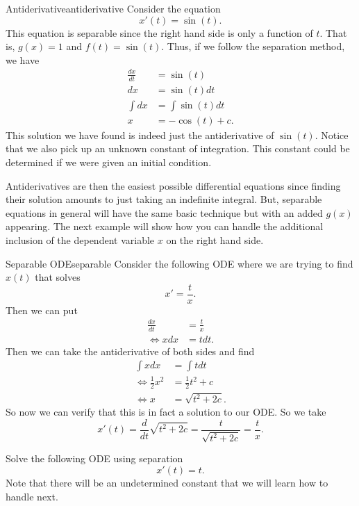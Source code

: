 \begin{ex}{Antiderivative}{antiderivative}
    Consider the equation
    \[
        x'(t) = \sin(t).
    \]
    This equation is separable since the right hand side is only a function of $t$. That is, $g(x)=1$ and $f(t)=\sin(t)$.  Thus, if we follow the separation method, we have
    \begin{align*}
        \frac{dx}{dt} &= \sin(t)\\
        dx &= \sin(t) dt\\
        \int dx &= \int \sin(t) dt\\
        x&= -\cos(t) + c.
    \end{align*}
    This solution we have found is indeed just the antiderivative of $\sin(t)$. Notice that we also pick up an unknown constant of integration. This constant could be determined if we were given an initial condition.     
\end{ex}

Antiderivatives are then the easiest possible differential equations since finding their solution amounts to just taking an indefinite integral.  But, separable equations in general will have the same basic technique but with an added $g(x)$ appearing.  The next example will show how you can handle the additional inclusion of the dependent variable $x$ on the right hand side.
        
        \begin{ex}{Separable ODE}{separable}
        Consider the following ODE where we are trying to find $x(t)$ that solves
        \[
        x'=\frac{t}{x}. 
        \]
        Then we can put
        \begin{align*}
            \frac{dx}{dt}&= \frac{t}{x}\\
            \iff xdx &= t dt.
        \end{align*}
        Then we can take the antiderivative of both sides and find
        \begin{align*}
            \int xdx &= \int t dt\\
            \iff \frac{1}{2}x^2 &= \frac{1}{2}t^2 + c\\
            \iff x&=\sqrt{t^2+2c}.
        \end{align*}
        So now we can verify that this is in fact a solution to our ODE.  So we take
        \[
        x'(t) = \frac{d}{dt}\sqrt{t^2+2c}= \frac{t}{\sqrt{t^2+2c}} = \frac{t}{x}.
        \]
        \end{ex}
        
        \begin{exercise}
        Solve the following ODE using separation
        \[
        x'(t)=t.
        \]
        Note that there will be an undetermined constant that we will learn how to handle next.
        \end{exercise}
        
